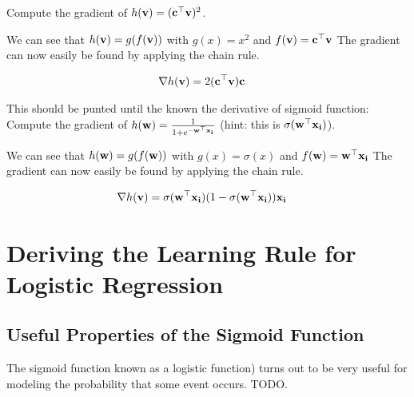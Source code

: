 \documentclass[assignment03_Solutions]{subfiles}
\begin{document}
\begin{exercise}
\bes
\item Compute the gradient of $h(\mathbf{v}) = (\mathbf{c}^\top \mathbf{v})^2$.
\begin{boxedsolution}
We can see that $h(\mathbf{v}) = g(f(\mathbf{v}))$ with $g(x) = x^2$ and $f(\mathbf{v}) = \mathbf{c}^\top \mathbf{v}$ The gradient can now easily be found by applying the chain rule.

\begin{align}
\nabla h(\mathbf{v}) &= 2(\mathbf{c}^\top \mathbf{v}) \mathbf{c}
\end{align}
\end{boxedsolution}
\item This should be punted until the known the derivative of sigmoid function: Compute the gradient of $h(\mathbf{w}) = \frac{1}{1+e^{-\mathbf{w}^\top \mathbf{x_i}}}$ (hint: this is $\sigma(\mathbf{w}^\top \mathbf{x_i})$).
\begin{boxedsolution}
We can see that $h(\mathbf{w}) = g(f(\mathbf{w}))$ with $g(x) = \sigma(x)$ and $f(\mathbf{w}) = \mathbf{w}^\top \mathbf{x_i}$ The gradient can now easily be found by applying the chain rule.

\begin{align}
\nabla h(\mathbf{v}) &= \sigma(\mathbf{w}^\top \mathbf{x_i})(1 - \sigma(\mathbf{w}^\top \mathbf{x_i}) ) \mathbf{x_i}
\end{align}

\end{boxedsolution}
\ees
\end{exercise}

\section{Deriving the Learning Rule for Logistic Regression}

\subsection{Useful Properties of the Sigmoid Function}

The sigmoid function known as a logistic function) turns out to be very useful for modeling the probability that some event occurs.  TODO.
\end{document}
